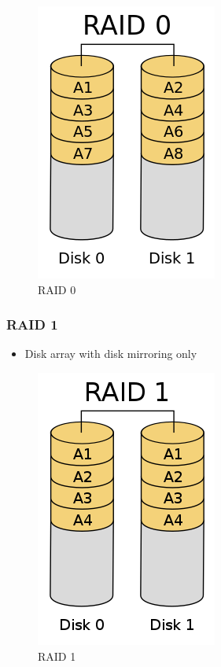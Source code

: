 \documentclass{article}
\theoremstyle{plain}
\theoremstyle{definition}
\begin{document}
\begin{figure}[!h]
    \centering
    \includegraphics[scale=0.3]{raid0.png}
    \caption{RAID 0}
    \label{fig:my_label}
\end{figure}

\subsubsection{RAID 1}
\begin{itemize}
    \item Disk array with disk mirroring only
\end{itemize}

\begin{figure}[!h]
    \centering
    \includegraphics[scale=0.3]{raid1.png}
    \caption{RAID 1}
    \label{fig:my_label_1}
\end{figure}
\end{document}
